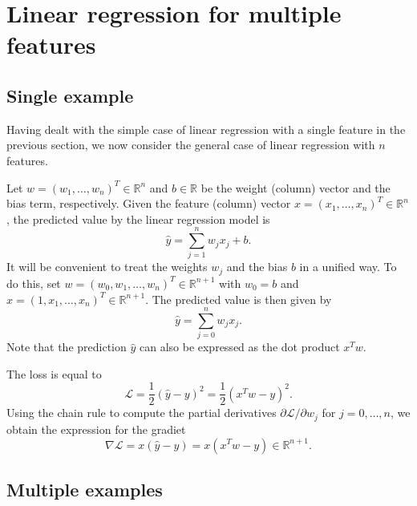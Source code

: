 \documentclass[12pt]{article}
\newcommand{\R}{\mathbb{R}}
\begin{document}
\section{Linear regression for multiple features}

\subsection{Single example}
Having dealt with the simple case of linear regression with a single feature in the previous section, we now consider the general case of linear regression with $n$ features. 

Let $w=(w_1,\ldots,w_n)^T\in\R^n$ and $b\in \R$ be the weight (column) vector and the bias term, respectively. Given the feature (column) vector $x=(x_1,\ldots,x_n)^T\in\R^n$, the predicted value by the linear regression model is
\begin{equation}
\hat{y}=\sum_{j=1}^n w_j x_j + b.
\end{equation}
It will be convenient to treat the weights $w_j$ and the bias $b$ in a unified way.  To do this, set $w=(w_0,w_1,\ldots,w_n)^T\in\R^{n+1}$ with $w_0=b$ and 
$x=(1, x_1,\ldots, x_n)^T\in\R^{n+1}$. The predicted value is then given by
\begin{equation}
\hat{y}=\sum_{j=0}^n w_j x_j.
\end{equation}
Note that the prediction $\hat{y}$ can also be expressed as the dot product  $x^T w$.

The loss is equal to 
\begin{equation}
\mathcal{L}=\frac{1}{2}(\hat{y}-y)^2 = \frac{1}{2}(x^T w - y)^2.
\end{equation}
Using the chain rule to compute the partial derivatives $\partial \mathcal{L} / \partial w_j$ for $j=0,\ldots,n$, we obtain the expression for the gradiet
\begin{equation}
\nabla\mathcal{L} = x (\hat{y}-y) = x (x^T w - y) \in \R^{n+1}.
\end{equation}

\subsection{Multiple examples}
\end{document}
